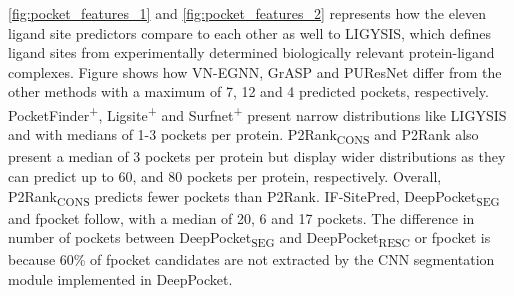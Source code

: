 \autoref{fig:pocket_features_1} and \autoref{fig:pocket_features_2} represents how the eleven ligand site predictors compare to each other as well to LIGYSIS, which defines ligand sites from experimentally determined biologically relevant protein-ligand complexes. Figure  shows how VN-EGNN, GrASP and PUResNet differ from the other methods with a maximum of 7, 12 and 4 predicted pockets, respectively. PocketFinder\textsuperscript{+}, Ligsite\textsuperscript{+} and Surfnet\textsuperscript{+} present narrow distributions like LIGYSIS and with medians of 1-3 pockets per protein. P2Rank\textsubscript{CONS} and P2Rank also present a median of 3 pockets per protein but display wider distributions as they can predict up to 60, and 80 pockets per protein, respectively. Overall, P2Rank\textsubscript{CONS} predicts fewer pockets than P2Rank. IF-SitePred, DeepPocket\textsubscript{SEG} and fpocket follow, with a median of 20, 6 and 17 pockets. The difference in number of pockets between DeepPocket\textsubscript{SEG} and DeepPocket\textsubscript{RESC} or fpocket is because 60\% of fpocket candidates are not extracted by the CNN segmentation module implemented in DeepPocket.


